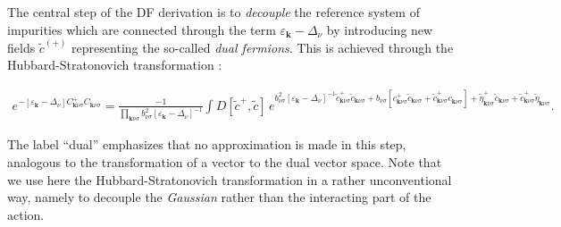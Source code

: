 \documentclass[rmp,aps,reprint,amsmath,amssymb,superscriptaddress,showpacs,nofootinbib]{revtex4-1}
\begin{document}
The central step of the DF derivation is to {\sl decouple} the reference system of impurities which are connected through the term  $\varepsilon_{\mathbf{k}}-\Delta_{\nu}$ by introducing new fields $\widetilde{c}^{(+)}$ representing the so-called {\sl dual fermions}. This is achieved through the Hubbard-Stratonovich transformation \cite{Rubtsov2008}:
\begin{widetext}
\begin{align}
\label{equ:hs}
  e^{-\left[\varepsilon_{\mathbf{k}}-\Delta_{\nu}\right]C^+_{\mathbf{k}\nu\sigma}C^{\phantom +}_{\mathbf{k}\nu\sigma}}=
  \frac{-1}{\prod_{\mathbf{k}\nu\sigma} b^{2}_{\nu\sigma}\left[\varepsilon_{\mathbf{k}}-\Delta_{\nu}\right]^{-1}}
  \int  \!D[\widetilde{c}^+,\widetilde{c}] \, e^{b^2_{\nu\sigma}\left[\varepsilon_{\mathbf{k}}-\Delta_{\nu}\right]^{-1}\widetilde{c}^+_{\mathbf{k}\nu\sigma}\widetilde{c}^{\phantom +}_{\mathbf{k}\nu\sigma} + b^{\phantom +}_{\nu\sigma}\left[c^+_{\mathbf{k}\nu\sigma}\widetilde{c}^{\phantom +}_{\mathbf{k}\nu\sigma}+\widetilde{c}^+_{\mathbf{k}\nu\sigma}c^{\phantom +}_{\mathbf{k}\nu\sigma}\right]+ {\widetilde{\eta}^+_{\mathbf{k}\nu\sigma}\widetilde{c}^{\phantom +}_{\mathbf{k}\nu\sigma}+\widetilde{c}^+_{\mathbf{k}\nu\sigma}\widetilde{\eta}^{\phantom +}_{\mathbf{k}\nu\sigma}}}.
\end{align}
\end{widetext}
The label ``dual'' emphasizes that no approximation is made in this step, analogous to the transformation of a vector to the dual vector space. Note that we use here the Hubbard-Stratonovich transformation in a rather unconventional way, namely to decouple the {\sl Gaussian} rather than the interacting part of the action. 
\end{document}
